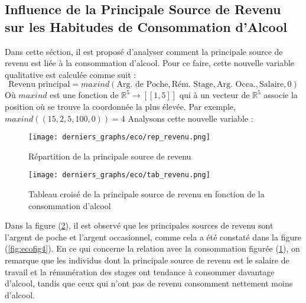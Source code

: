 \documentclass{article}
\begin{document}
\subsection{Influence de la Principale Source de Revenu sur les Habitudes de Consommation d'Alcool}
Dans cette séction, il est proposé d'analyser comment la principale source de revenu est liée à la consommation d'alcool. Pour ce faire, cette nouvelle variable qualitative est calculée comme suit : \\
\begin{equation}
    \text{Revenu principal} = maxind(\text{Arg. de Poche},\text{Rém. Stage},\text{Arg. Occa.},\text{Salaire}, 0)
\end{equation}
Où $maxind$ est une fonction de $\mathbb{R}^5 \longrightarrow \left[ \left[1,5\right] \right]$ qui à un vecteur de $\mathbb{R}^5$ associe la position où se trouve la coordonnée la plus élevée. Par exemple, 
$maxind((15,2,5,100,0)) = 4$
Analysons cette nouvelle variable : 
\begin{figure}[H]
  \centering
  \texttt{[image: derniers\_graphs/eco/rep\_revenu.png]} 
  \caption{Répartition de la principale source de revenu}
  \label{fig:ecofig7}
\end{figure}

\begin{figure}[H]
  \centering
  \texttt{[image: derniers\_graphs/eco/tab\_revenu.png]} 
  \caption{Tableau croisé de la principale source de revenu en fonction de la consommation d'alcool}
  \label{fig:ecofig8}
\end{figure}
Dans la figure (\ref{fig:ecofig8}), il est observé que les principales sources de revenu sont l'argent de poche et l'argent occasionnel, comme cela a été constaté dans la figure (\ref{fig:ecofig4}). En ce qui concerne la relation avec la consommation figurée (\ref{fig:ecofig7}), on remarque que les individus dont la principale source de revenu est le salaire de travail et la rémunération des stages ont tendance à consommer davantage d'alcool, tandis que ceux qui n'ont pas de revenu consomment nettement moins d'alcool.
\end{document}
